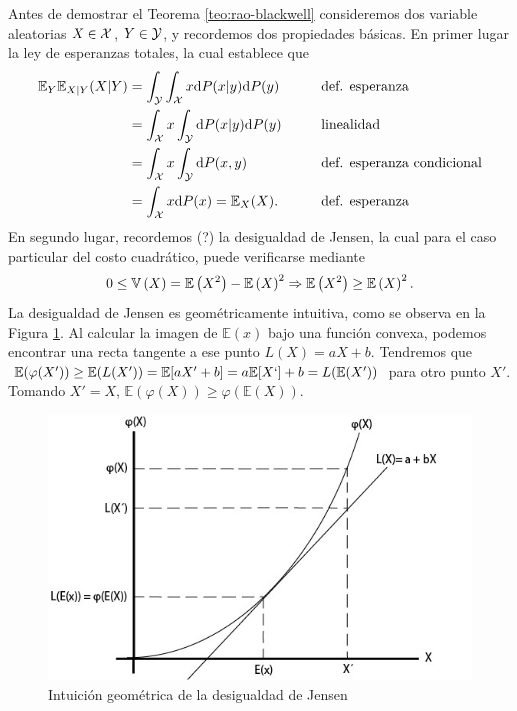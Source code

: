 Antes de demostrar el Teorema \ref{teo:rao-blackwell} consideremos dos variable aleatorias $X\in{\mathcal X}$, $Y\in{\mathcal Y}$, y recordemos dos propiedades básicas. En primer lugar la ley de esperanzas totales, la cual establece que 
\begin{alignat}{3}
	\mathbb{E}_Y{\mathbb{E}_{X|Y}{(X|Y)}} &= \int_{\mathcal Y}\int_{\mathcal X} x {\text{d}} P(x|y) {\text{d}} P(y) \quad\quad&&\text{def. esperanza}\nonumber\\
				&=  \int_{\mathcal X} x \int_{\mathcal Y} {\text{d}} P(x|y) {\text{d}} P(y) &&\text{linealidad}\nonumber\\
				&=  \int_{\mathcal X} x \int_{\mathcal Y} {\text{d}} P(x,y) &&\text{def. esperanza condicional}\nonumber\\
				&=  \int_{\mathcal X} x {\text{d}} P(x) = \mathbb{E}_X(X). &&\text{def. esperanza} \label{eq:total_expectation}
\end{alignat}
En segundo lugar, recordemos (?) la desigualdad de Jensen, la cual para el caso particular del costo cuadrático, puede verificarse mediante
\begin{equation}
	0 \leq \mathbb{V} \left(X\right) =  \mathbb{E} \left(X^2\right)-\mathbb{E} \left(X\right)^2 \Rightarrow \mathbb{E} \left(X^2\right) \geq \mathbb{E} \left(X\right)^2. \label{eq:jensen_var}
\end{equation}
La desigualdad de Jensen es geométricamente intuitiva, como se observa en la Figura \ref{fig:intuicion_jensen}. Al calcular la imagen de $\mathbb{E}(x)$ bajo una función convexa, podemos encontrar una recta tangente a ese punto $L(X)=aX+b$. Tendremos que $\mathbb{E}(\varphi(X')) \geq \mathbb{E}(L(X'))=\mathbb{E}[aX'+b]=a\mathbb{E}[X`]+b=L(\mathbb{E}(X'))$ para otro punto $X'$. Tomando $X'=X$, $\mathbb{E}(\varphi(X)) \geq \varphi(\mathbb{E}(X))$.
\begin{figure}[ht]
    \centering
    \includegraphics[scale=0.5]{img/Intuicion_Jensen.jpeg}
    \caption{Intuición geométrica de la desigualdad de Jensen }
    \label{fig:intuicion_jensen}
\end{figure}

